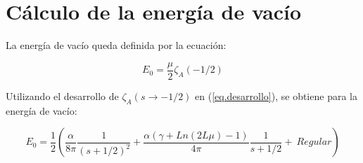 \begin{comment}
\begin{equation}
\frac{1 }{2 \pi i}
\int _{circulo} \lambda ^{-2s } \partial \lambda \ Ln \left[
					\frac{e ^{\frac{i \alpha Ln( 2 \lambda L )}{2 \lambda}} e ^{2 i \lambda L} S1}
					{\Gamma \left( 1 - \frac{i \alpha}{2 \lambda} \right)} - 
					\frac{e ^{\frac{-i \alpha Ln(2 \lambda L )}{2 \lambda}} S2}
					{\Gamma \left( 1 + \frac{i \alpha}{2 \lambda} \right)}					
					\right] d \lambda
\end{equation}
\end{comment}


\section{Cálculo de la energía de vacío}

La energía de vacío queda definida por la ecuación: 

\begin{equation}
    E _0 = \frac{\mu }{2}  
    \zeta _A \left( - 1/2 \right) 
\end{equation}

Utilizando el desarrollo de $\zeta _A (s \rightarrow -1/2)$ en (\ref{eq.desarrollo}), se obtiene para la energía de vacío:

\begin{equation}
E _0 = \frac{1}{2} \left(
				\frac{\alpha}{8 \pi  } \frac{1}{(s+1/2)^2} + 
				\frac{\alpha ( \gamma  + Ln(2L \mu ) -1 )}{4 \pi  } \frac{1}{s+1/2} +
				\ Regular
				\right)
\end{equation}

 
